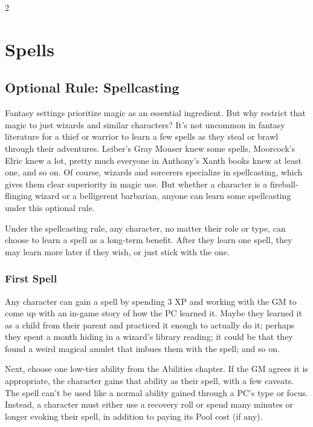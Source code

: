 \begin{multicols}{2}

\chapter{Spells}

\section{Optional Rule: Spellcasting}

Fantasy settings prioritize magic as an essential ingredient. But why restrict that magic to just wizards and similar characters? It’s not uncommon in fantasy literature for a thief or warrior to learn a few spells as they steal or brawl through their adventures. Leiber’s Gray Mouser knew some spells, Moorcock’s Elric knew a lot, pretty much everyone in Anthony’s Xanth books knew at least one, and so on. Of course, wizards and sorcerers specialize in spellcasting, which gives them clear superiority in magic use. But whether a character is a fireball-flinging wizard or a belligerent barbarian, anyone can learn some spellcasting under this optional rule.

Under the spellcasting rule, any character, no matter their role or type, can choose to learn a spell as a long-term benefit. After they learn one spell, they may learn more later if they wish, or just stick with the one.

\subsection{First Spell}

Any character can gain a spell by spending 3 XP and working with the GM to come up with an in-game story of how the PC learned it. Maybe they learned it as a child from their parent and practiced it enough to actually do it; perhaps they spent a month hiding in a wizard’s library reading; it could be that they found a weird magical amulet that imbues them with the spell; and so on.

Next, choose one low-tier ability from the Abilities chapter. If the GM agrees it is appropriate, the character gains that ability as their spell, with a few caveats. The spell can’t be used like a normal ability gained through a PC’s type or focus. Instead, a character must either use a recovery roll or spend many minutes or longer evoking their spell, in addition to paying its Pool cost (if any).


\end{multicols}
